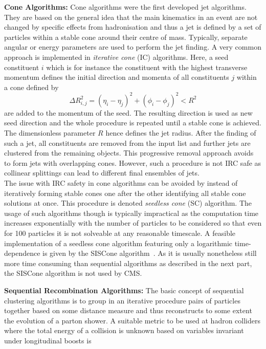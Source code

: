\begin{description}
 \item \textbf{Cone Algorithms:} Cone algorithms were the first developed jet algorithms. They are based on the general idea that the main kinematics in an event are not changed by specific effects from hadronisation and thus a jet is defined by a set of particles within a stable cone around their centre of mass. Typically, separate angular or energy parameters are used to perform the jet finding. A very common approach is implemented in \textit{iterative cone} (IC) algorithms. Here, a seed constituent $i$ which is for instance the constituent with the highest transverse momentum defines the initial direction and momenta of all constituents $j$ within a cone defined by
\begin{equation}
 \Delta R_{i,j}^2 = (\eta_i - \eta_j)^2 + (\phi_i - \phi_j)^2 < R^2
\end{equation}
are added to the momentum of the seed. The resulting direction is used as new seed direction and the whole procedure is repeated until a stable cone is achieved. The dimensionless parameter $R$ hence defines the jet radius. After the finding of such a jet, all constituents are removed from the input list and further jets are clustered from the remaining objects. This progressive removal approach avoids to form jets with overlapping cones. However, such a procedure is not IRC safe as collinear splittings can lead to different final ensembles of jets. \\
The issue with IRC safety in cone algorithms can be avoided by instead of iteratively forming stable cones one after the other identifying all stable cone solutions at once. This procedure is denoted \textit{seedless cone} (SC) algorithm. The usage of such algorithms though is typically impractical as the computation time increases exponentially with the number of particles to be considered so that even for 100 particles it is not solveable at any reasonable timescale. A feasible implementation of a seedless cone algorithm featuring only a logarithmic time-dependence is given by the SISCone algorithm~\cite{Salam:2007xv}. As it is usually nonetheless still more time consuming than sequential algorithms as described in the next part, the SISCone algorithm is not used by CMS.
 \item \textbf{Sequential Recombination Algorithms:} The basic concept of sequential clustering algorithms is to group in an iterative procedure pairs of particles together based on some distance measure and thus reconstructs to some extent the evolution of a parton shower. A suitable metric to be used at hadron colliders where the total energy of a collision is unknown based on variables invariant under longitudinal boosts is 

\end{description}
